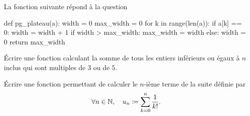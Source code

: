 \documentclass{magnoliaold}
\begin{document}
\begin{sol}
La fonction suivante répond à la question
\begin{pythoncodeline}
def pg_plateau(a):
    width = 0
    max_width = 0
    for k in range(len(a)):
        if a[k] == 0:
            width = width + 1
            if width > max_width:
                max_width = width
        else:
            width = 0
    return max_width
\end{pythoncodeline}
\end{sol}


Écrire une fonction calculant la somme de tous les entiers inférieurs ou égaux à $n$ inclus
qui sont multiples de $3$ ou de $5$.

Écrire une fonction permettant de calculer le $n$-ième terme de la suite définie par
\[\forall n\in\mathbb{N} ,\quad u_n\coloneqq\sum_{k=0}^n \frac{1}{k!}.\]
\end{document}
